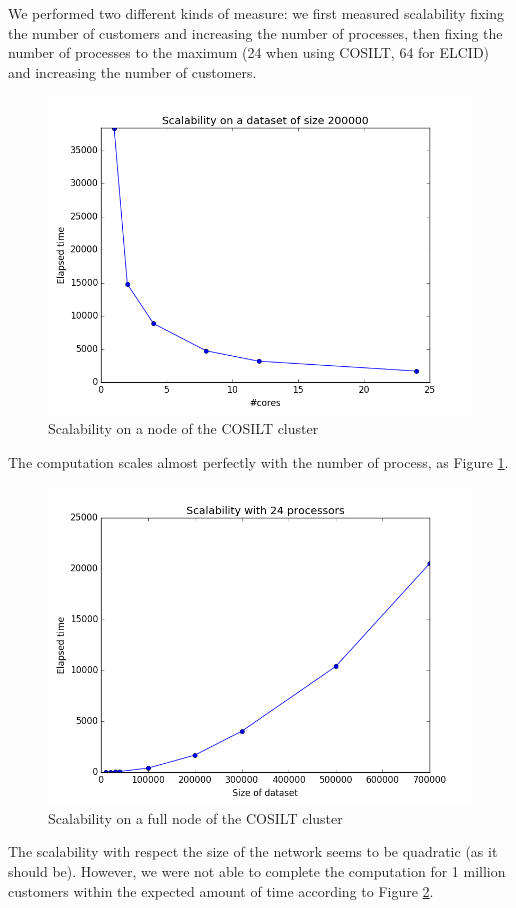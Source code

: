 \documentclass[a4paper,11pt]{book}
\begin{document}
We performed two different kinds of measure: we first measured scalability fixing the number of customers and increasing the number of processes, then fixing the number of processes to the maximum (24 when using COSILT, 64 for ELCID) and increasing the number of customers.
 \begin{figure}[H]
\centering
\includegraphics[height=7.0 cm,width=10 cm]{label_200K.png}
\caption{Scalability on a node of the COSILT cluster}\label{fig:200}
\end{figure}
The computation scales almost perfectly with the number of process, as Figure \ref{fig:200}.\\

 \begin{figure}[htbp]
\centering
\includegraphics[height=7.0 cm,width=10 cm]{24coresb.png}
\caption{Scalability on a full node of the COSILT cluster}\label{fig:problem}
\end{figure}
The scalability with respect the size of the network seems to be quadratic (as it should be). However, we were not able to complete the computation for 1 million customers within the expected amount of time according to Figure \ref{fig:problem}.\\
\end{document}
